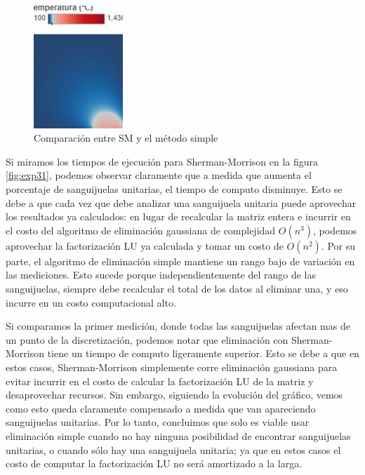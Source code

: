\begin{figure}[h]
    \centering
    \includegraphics[width=0.30\textwidth]{Ejemplo SM}
    \caption{Comparación entre SM y el método simple}
    \label{fig:exp31-vis}
\end{figure}

Si miramos los tiempos de ejecución para Sherman-Morrison en la figura \ref{fig:exp31}, podemos observar claramente que a medida que aumenta el porcentaje de sanguijuelas unitarias, el tiempo de computo disminuye. Esto se debe a que cada vez que debe analizar una sanguijuela unitaria puede aprovechar los resultados ya calculados: en lugar de recalcular la matriz entera e incurrir en el costo del algoritmo de eliminación gaussiana de complejidad $O(n^3)$, podemos aprovechar la factorización LU ya calculada y tomar un costo de $O(n^2)$. Por su parte, el algoritmo de eliminación simple mantiene un rango bajo de variación en las mediciones. Esto sucede porque independientemente del rango de las sanguijuelas, siempre debe recalcular el total de los datos al eliminar una, y eso incurre en un costo computacional alto.

Si comparamos la primer medición, donde todas las sanguijuelas afectan mas de un punto de la discretización, podemos notar que eliminación con Sherman-Morrison tiene un tiempo de computo ligeramente superior. Esto se debe a que en estos casos, Sherman-Morrison simplemente corre eliminación gaussiana para evitar incurrir en el costo de calcular la factorización LU de la matriz y desaprovechar recursos. Sin embargo, siguiendo la evolución del gráfico, vemos como esto queda claramente compensado a medida que van apareciendo sanguijuelas unitarias. Por lo tanto, concluimos que solo es viable usar eliminación simple cuando no hay ninguna posibilidad de encontrar sanguijuelas unitarias, o cuando sólo hay una sanguijuela unitaria; ya que en estos casos el costo de computar la factorización LU no será amortizado a la larga.
